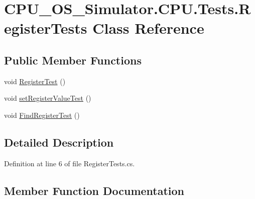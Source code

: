\hypertarget{class_c_p_u___o_s___simulator_1_1_c_p_u_1_1_tests_1_1_register_tests}{}\section{C\+P\+U\+\_\+\+O\+S\+\_\+\+Simulator.\+C\+P\+U.\+Tests.\+Register\+Tests Class Reference}
\label{class_c_p_u___o_s___simulator_1_1_c_p_u_1_1_tests_1_1_register_tests}
\subsection*{Public Member Functions}
\begin{DoxyCompactItemize}
\item 
void \hyperlink{class_c_p_u___o_s___simulator_1_1_c_p_u_1_1_tests_1_1_register_tests_a1fdf6a35fde71647f9b85c74d9893476}{Register\+Test} ()
\item 
void \hyperlink{class_c_p_u___o_s___simulator_1_1_c_p_u_1_1_tests_1_1_register_tests_a50a7835c27a463a0a36ae36ecf139271}{set\+Register\+Value\+Test} ()
\item 
void \hyperlink{class_c_p_u___o_s___simulator_1_1_c_p_u_1_1_tests_1_1_register_tests_ac5bd928d3c3538b8b4bf5b75e6ec7867}{Find\+Register\+Test} ()
\end{DoxyCompactItemize}


\subsection{Detailed Description}


Definition at line 6 of file Register\+Tests.\+cs.



\subsection{Member Function Documentation}
\hypertarget{class_c_p_u___o_s___simulator_1_1_c_p_u_1_1_tests_1_1_register_tests_ac5bd928d3c3538b8b4bf5b75e6ec7867}{}
